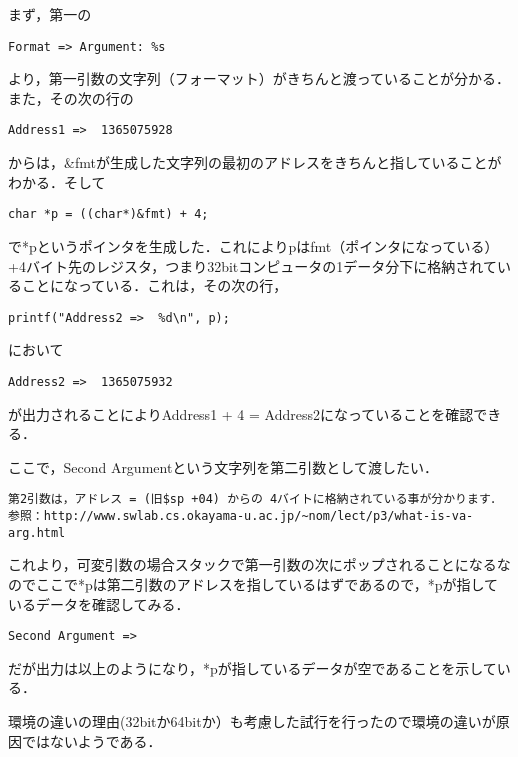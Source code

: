 \documentclass[a4j]{jarticle}
\begin{document}
まず，第一の

\begin{verbatim}
Format => Argument: %s
\end{verbatim}

より，第一引数の文字列（フォーマット）がきちんと渡っていることが分かる．また，その次の行の

\begin{verbatim}
Address1 =>  1365075928
\end{verbatim}

からは，\&fmtが生成した文字列の最初のアドレスをきちんと指していることがわかる．そして

\begin{verbatim}
char *p = ((char*)&fmt) + 4;
\end{verbatim}

で*pというポインタを生成した．これによりpはfmt（ポインタになっている）+4バイト先のレジスタ，つまり32bitコンピュータの1データ分下に格納されていることになっている．これは，その次の行，

\begin{verbatim}
printf("Address2 =>  %d\n", p);
\end{verbatim}

において

\begin{verbatim}
Address2 =>  1365075932
\end{verbatim}

が出力されることによりAddress1 + 4 = Address2になっていることを確認できる．

ここで，Second Argumentという文字列を第二引数として渡したい．

\begin{verbatim}
第2引数は，アドレス = (旧$sp +04) からの 4バイトに格納されている事が分かります．
参照：http://www.swlab.cs.okayama-u.ac.jp/~nom/lect/p3/what-is-va-arg.html
\end{verbatim}

これより，可変引数の場合スタックで第一引数の次にポップされることになるなのでここで*pは第二引数のアドレスを指しているはずであるので，*pが指しているデータを確認してみる．

\begin{verbatim}
Second Argument => 
\end{verbatim}

だが出力は以上のようになり，*pが指しているデータが空であることを示している．

環境の違いの理由(32bitか64bitか）も考慮した試行を行ったので環境の違いが原因ではないようである．
\end{document}
